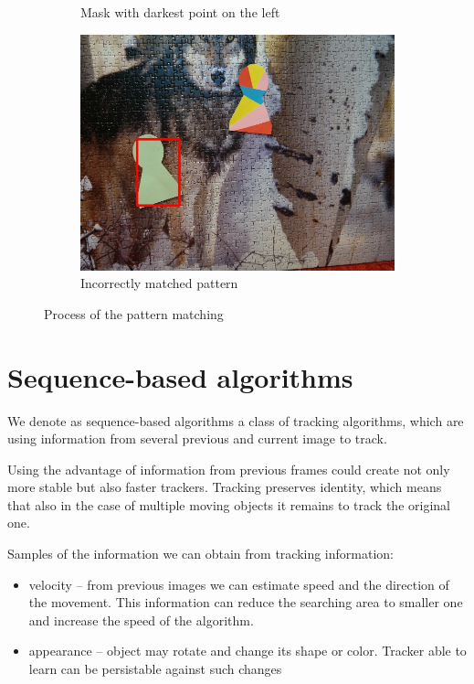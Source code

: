 \begin{figure}
\begin{subfigure}{0.48\linewidth}
    \caption{Mask with darkest point on the left}
  \end{subfigure}
  \begin{subfigure}{0.48\linewidth}
    \includegraphics[width=\linewidth]{img/pattern_matching/result-incorrect.jpg}
    \caption{Incorrectly matched pattern}
  \end{subfigure}
  \caption{Process of the pattern matching}
  \label{fig:pattern-matching-tracker}
\end{figure}



\section{Sequence-based algorithms}

We denote as sequence-based algorithms a class of tracking algorithms, which
are using information from several previous and current image to track.

Using the advantage of information from previous frames could create not only
more stable but also faster trackers. Tracking preserves identity, which means
that also in the case of multiple moving objects it remains to track the original
one.

Samples of the information we can obtain from tracking information:
\begin{itemize}
\item velocity -- from previous images we can estimate speed and the direction of
  the movement. This information can reduce the searching area to smaller one
  and increase the speed of the algorithm.
\item appearance -- object may rotate and change its shape or color. Tracker able to
  learn can be persistable against such changes
\end{itemize}

